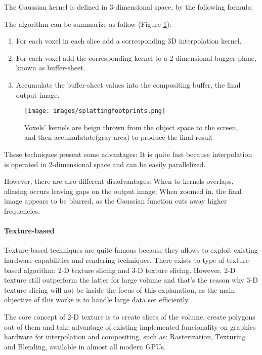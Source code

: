 \documentclass[12pt,a4paper]{extarticle}
\newcommand{\linespace}{\vspace{8pt}}
\begin{document}
The Gaussian kernel is defined in 3-dimensional space, by the following formula:
\linespace
\begin{center}
\end{center}
\linespace
The algorithm can be summarize as follow (Figure \ref{fig:splattingfootprints}):
\begin{enumerate}
\item For each voxel in each slice add a corresponding 3D interpolation kernel.
\item For each voxel add the corresponding kernel to a 2-dimensional bugger plane, known as buffer-sheet.
\item Accumulate the buffer-sheet values into the compositing buffer, the final output image. 
\end{enumerate}

\begin{figure}[hbtp]
\centering
\texttt{[image: images/splattingfootprints.png]}
\caption{Voxels' kernels are beign thrown from the object space to the screen, and then accumulatate(gray area) to produce the final result}
\label{fig:splattingfootprints}
\end{figure}


These techniques present some advantages: It is quite fast because interpolation is operated in 2-dimensional space and can be easily parallelized.


However, there are also different disadvantages: When to kernels overlaps, aliasing occurs leaving gaps on the output image; When zoomed in, the final image appears to be blurred, as the Gaussian function cuts away higher frequencies.

\paragraph{Texture-based} Texture-based techniques are quite famous because they allows to exploit existing hardware capabilities and rendering techniques. There exists to type of texture-based algorithm: 2-D texture slicing and 3-D texture slicing. However, 2-D texture still outperform the latter for large volume and that's the reason why 3-D texture slicing will not be inside the focus of this explanation, as the main objective of this works is to handle large data set efficiently.


The core concept of 2-D texture is to create slices of the volume, create polygons out of them and take advantage of existing implemented funcionality on graphics hardware for interpolation and compositing, such as: Rasterization, Texturing and Blending, available in almost all modern GPUs.
\linespace
\end{document}
